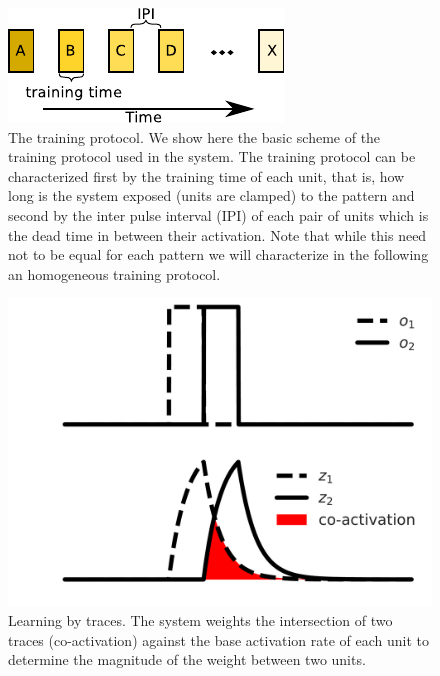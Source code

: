 \documentclass[10pt,a4paper]{article}
\begin{document}
\begin{figure}[H]
\centering
\includegraphics[scale=1.40]{protocol.pdf}
\caption{The training protocol. We show here the basic scheme of the training protocol used in the system. The training protocol can be characterized first by the training time of each unit, that is, how long is the system exposed (units are clamped) to the pattern and second by the inter pulse interval (IPI) of each pair of units which is the dead time in between their activation. Note that while this need not to be equal for each pattern we will characterize in the following an homogeneous training protocol.}
\label{fig:training_protocol}
\end{figure}


\begin{figure}[H]
\centering
\includegraphics[scale=0.30]{traces_example.pdf}
\caption{Learning by traces. The system weights the intersection of two traces (co-activation) against the base activation rate of each unit to determine the magnitude of the weight between two units. }
\label{fig:traces_example}
\end{figure}
\end{document}
